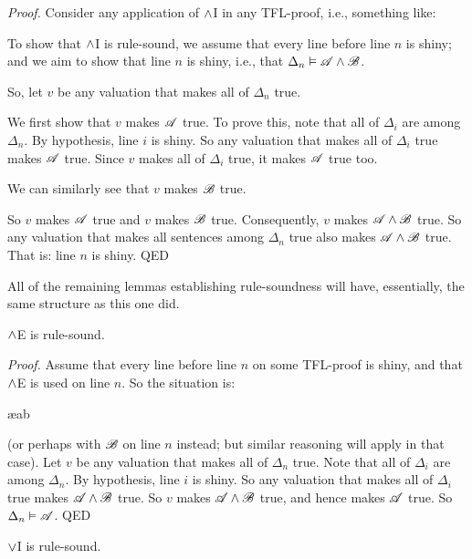 \emph{Proof.} Consider any application of $\wedge$I in any TFL-proof, i.e., something like:
\begin{fitchproof}
	 
\end{fitchproof}\noindent
To show that $\wedge$I is rule-sound, we assume that every line before line $n$ is shiny; and we aim to show that line $n$ is shiny, i.e., that $\Delta_n \vDash \mathscr{A} \wedge \mathscr{B}$.

So, let $v$ be any valuation that makes all of $\Delta_{n}$ true.

We first show that $v$ makes $\mathscr{A}$ true. To prove this, note that all of $\Delta_i$ are among $\Delta_{n}$. By hypothesis, line $i$ is shiny. So any valuation that makes all of $\Delta_i$ true makes $\mathscr{A}$ true. Since $v$ makes all of $\Delta_i$ true, it makes $\mathscr{A}$ true too.

We can similarly see that $v$ makes $\mathscr{B}$ true.

So $v$ makes $\mathscr{A}$ true and $v$ makes $\mathscr{B}$ true. Consequently, $v$ makes $\mathscr{A}\wedge\mathscr{B}$ true. So any valuation that makes all sentences among $\Delta_{n}$ true also makes $\mathscr{A} \wedge \mathscr{B}$ true. That is: line $n$ is shiny. QED


All of the remaining lemmas establishing rule-soundness will have, essentially, the same structure as this one did.

\begin{factoidboxe}$\wedge$E is rule-sound.
\end{factoidboxe}

\emph{Proof.}
	Assume that every line before line $n$ on some TFL-proof is shiny, and that $\wedge$E is used on line $n$. So the situation is:
		   \begin{fitchproof}
			    \ae{ab}
		   \end{fitchproof}\noindent
(or perhaps with $\mathscr{B}$ on line $n$ instead; but similar reasoning will apply in that case). Let $v$ be any valuation that makes all of $\Delta_{n}$ true. Note that all of $\Delta_i$ are among $\Delta_{n}$. By hypothesis, line $i$ is shiny. So any valuation that makes all of $\Delta_i$ true makes $\mathscr{A}\wedge\mathscr{B}$ true. So $v$ makes $\mathscr{A}\wedge\mathscr{B}$ true, and hence makes $\mathscr{A}$ true. So $\Delta_{n} \vDash \mathscr{A}$. QED


\begin{factoidboxe}$\vee$I is rule-sound.
\end{factoidboxe}


